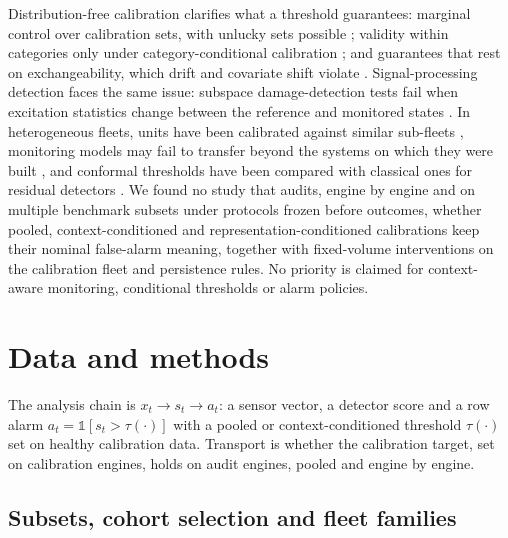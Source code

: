 \documentclass[preprint,11pt,a4paper]{elsarticle}
\begin{document}
Distribution-free calibration clarifies what a threshold guarantees: marginal control over calibration sets, with unlucky sets possible \cite{N16}; validity within categories only under category-conditional calibration \cite{N7}; and guarantees that rest on exchangeability, which drift and covariate shift violate \cite{N20,N30}. Signal-processing detection faces the same issue: subspace damage-detection tests fail when excitation statistics change between the reference and monitored states \cite{N15}. In heterogeneous fleets, units have been calibrated against similar sub-fleets \cite{N44}, monitoring models may fail to transfer beyond the systems on which they were built \cite{N21}, and conformal thresholds have been compared with classical ones for residual detectors \cite{N41}. We found no study that audits, engine by engine and on multiple benchmark subsets under protocols frozen before outcomes, whether pooled, context-conditioned and representation-conditioned calibrations keep their nominal false-alarm meaning, together with fixed-volume interventions on the calibration fleet and persistence rules. No priority is claimed for context-aware monitoring, conditional thresholds or alarm policies.

\section{Data and methods}

The analysis chain is $x_t \rightarrow s_t \rightarrow a_t$: a sensor vector, a detector score and a row alarm $a_t = \mathbb{1}[s_t > \tau(\cdot)]$ with a pooled or context-conditioned threshold $\tau(\cdot)$ set on healthy calibration data. Transport is whether the calibration target, set on calibration engines, holds on audit engines, pooled and engine by engine.

\subsection{Subsets, cohort selection and fleet families}
\end{document}
